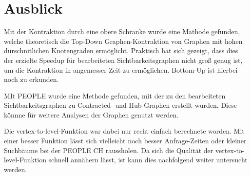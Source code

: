 \chapter{Ausblick}

Mit der Kontraktion durch eine obere Schranke wurde eine Mathode gefunden, welche theoretisch die Top-Down Graphen-Kontraktion von Graphen mit hohen durschnitlichen Knotengraden ermöglicht.
Praktisch hat sich gezeigt, dass dies der erzielte Speedup für bearbeiteten Sichtbarkeitsgraphen nicht groß genug ist, um die Kontraktion in angemesser Zeit zu ermöglichen.
Bottom-Up ist hierbei noch zu erkunden.

MIt PEOPLE wurde eine Methode gefunden, mit der zu den bearbeiteten Sichtbarkeitsgraphen zu Contracted- und Hub-Graphen erstellt wurden.
Diese könnne für weitere Analysen der Graphen genutzt werden.

Die vertex-to-level-Funktion war dabei nur recht einfach berechnete worden.
Mit einer besser Funktion lässt sich vielleicht noch besser Anfrage-Zeiten oder kleiner Suchbäume bei der PEOPLE CH raussholen.
Da sich die Qualität der vertex-to-level-Funktion schnell annähern lässt, ist kann dies nachfolgend weiter untersucht werden.
